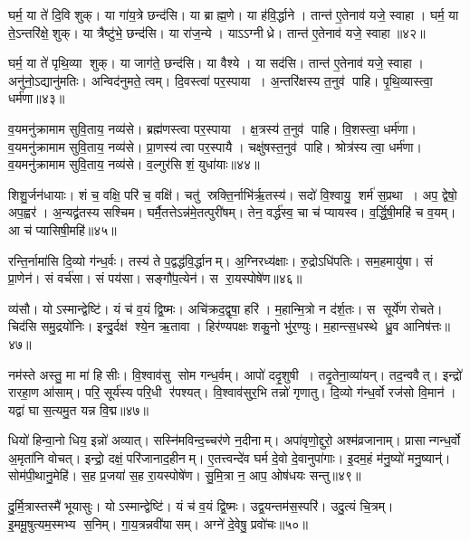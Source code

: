 घर्म॒ या ते॑ दि॒वि शुक्। या गा॑य॒त्रे छन्द॑सि। या ब्राह्म॒णे। या ह॑वि॒र्द्धाने। तान्त॑ ए॒तेनाव॑ यजे॒ स्वाहा। घर्म॒ या ते॒ऽन्तरि॑क्षे॒ शुक्। या त्रैष्टु॑भे॒ छन्द॑सि। या रा॑ज॒न्ये। याऽऽग्नीध्रे। तान्त॑ ए॒तेनाव॑ यजे॒ स्वाहा॥४२॥

घर्म॒ या ते॑ पृथि॒व्या शुक्। या जाग॑ते॒ छन्द॑सि। या वैश्ये। या सद॑सि। तान्त॑ ए॒तेनाव॑ यजे॒ स्वाहा। अनु॑नो॒ऽद्यानु॑मतिः। अन्विद॑नुमते॒ त्वम्। दि॒वस्त्वा॑ पर॒स्पाया। अ॒न्तरि॑क्षस्य त॒नुव॑ पाहि। पृ॒थि॒व्यास्त्वा॒ धर्म॑णा॥४३॥

व॒यमनु॑क्रामाम सुवि॒ताय॒ नव्य॑से। ब्रह्म॑णस्त्वा पर॒स्पाया। क्ष॒त्रस्य॑ त॒नुव॑ पाहि। वि॒शस्त्वा॒ धर्म॑णा। व॒यमनु॑क्रामाम सुवि॒ताय॒ नव्य॑से। प्रा॒णस्य॑ त्वा पर॒स्पायै। चक्षु॑षस्त॒नुव॑ पाहि। श्रोत्र॑स्य त्वा॒ धर्म॑णा। व॒यमनु॑क्रामाम सुवि॒ताय॒ नव्य॑से। व॒ल्गुर॑सि शं॒ युधा॑याः॥४४॥

शिशु॒र्जन॑धायाः। शं च॒ वक्षि॒ परि॑ च॒ वक्षि॑। चतु॑ स्रक्ति॒र्नाभि॑र्\mbox{}ऋ॒तस्य॑। सदो॑ वि॒श्वायु॒ शर्म॑ स॒प्रथा। अप॒ द्वेषो॒ अप॒ह्वर॑। अ॒न्यद्व्र॑तस्य सश्चिम। घर्मै॒तत्तेऽन्न॑मे॒तत्पुरी॑षम्। तेन॒ वर्द्ध॑स्व॒ चा च॑ प्यायस्व। व॒र्द्धि॒षी॒महि॑ च व॒यम्। आ च॑ प्यासिषी॒महि॑॥४५॥

रन्ति॒र्नामा॑सि दि॒व्यो ग॑न्ध॒र्वः। तस्य॑ ते प॒द्वद्ध॑वि॒र्द्धानम्। अ॒ग्निरध्य॑क्षाः। रु॒द्रोऽधि॑पतिः। सम॒हमायु॑षा। सं प्रा॒णेन॑। सं वर्च॑सा। सं पय॑सा। सङ्गौ॑प॒त्येन॑। स रा॒यस्पोषे॑ण॥४६॥

व्य॑सौ। योऽस्मान्द्वेष्टि॑। यं च॑ व॒यं द्वि॒ष्मः। अचि॑क्रद॒द्वृषा॒ हरि॑। म॒हान्मि॒त्रो न द॑र्\mbox{}श॒तः। स सूर्ये॑ण रोचते। चिद॑सि समु॒द्रयो॑निः। इन्दु॒र्दक्ष॑ श्ये॒न ऋ॒तावा। हिर॑ण्यपक्षः  शकु॒नो भु॑र॒ण्युः। म॒हान्त्स॒धस्थे ध्रु॒व आनिष॑त्तः॥४७॥

नम॑स्ते अस्तु॒ मा मा॑ हिसीः। वि॒श्वाव॑सु सोम गन्ध॒र्वम्। आपो॑ ददृ॒शुषी। तदृ॒तेना॒व्या॑यन्। तद॒न्ववैत्। इन्द्रो॑ रारहा॒ण आ॑साम्। परि॒ सूर्य॑स्य परि॒धी र॑पश्यत्। वि॒श्वाव॑सुर॒भि तन्नो॑ गृणातु। दि॒व्यो ग॑न्ध॒र्वो रज॑सो वि॒मान॑। यद्वा॑ घा स॒त्यमु॒त यन्न वि॒द्म॥४७॥

धियो॑ हिन्वा॒नो धिय॒ इन्नो॑ अव्यात्। सस्नि॑मविन्द॒च्चर॑णे न॒दीनाम्। अपा॑वृणो॒द्दुरो॒ अश्म॑व्रजानाम्। प्रासान्गन्ध॒र्वो अ॒मृता॑नि वोचत्। इन्द्रो॒ दक्षं॒ परि॑जानाद॒हीनम्। ए॒तत्त्वन्दे॑व घर्म दे॒वो दे॒वानुपा॑गाः। इ॒दम॒हं म॑नु॒ष्यो॑ मनु॒ष्यान्॑। सोम॑पी॒थानु॒मेहि॑। स॒ह प्र॒जया॑ स॒ह रा॒यस्पोषे॑ण। सु॒मि॒त्रा न॒ आप॒ ओष॑धयः सन्तु॥४९॥

दु॒र्मि॒त्रास्तस्मै॑ भूयासुः। योऽस्मान्द्वेष्टि॑। यं च॑ व॒यं द्वि॒ष्मः। उद्व॒यन्तम॑स॒स्परि॑। उदु॒त्यं चि॒त्रम्। इ॒ममू॒षुत्यम॒स्मभ्य स॒निम्। गा॒य॒त्रन्नवी॑यासम्। अग्ने॑ दे॒वेषु॒ प्रवो॑चः॥५०॥
\anuvakamend[याऽऽग्नीध्रे॒ तान्त॑ ए॒तेनाव॑ यजे॒ स्वाहा॒ धर्म॑णा शं॒ युधा॑याः प्यासिषी॒महि॒ पोषे॑ण॒ निष॑त्तो वि॒द्म स॑न्त्व॒ष्टौ]

